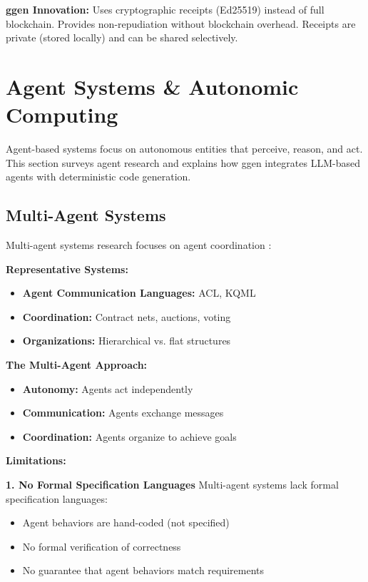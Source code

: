 \textbf{ggen Innovation:} Uses cryptographic receipts (Ed25519) instead of full blockchain. Provides non-repudiation without blockchain overhead. Receipts are private (stored locally) and can be shared selectively.

\section{Agent Systems \& Autonomic Computing}

Agent-based systems focus on autonomous entities that perceive, reason, and act. This section surveys agent research and explains how ggen integrates LLM-based agents with deterministic code generation.

\subsection{Multi-Agent Systems}

Multi-agent systems research focuses on agent coordination \cite{wooldridge1995multiagent, weiss1999multiagent}:

\textbf{Representative Systems:}
\begin{itemize}
    \item \textbf{Agent Communication Languages:} ACL, KQML
    \item \textbf{Coordination:} Contract nets, auctions, voting
    \item \textbf{Organizations:} Hierarchical vs. flat structures
\end{itemize}

\textbf{The Multi-Agent Approach:}
\begin{itemize}
    \item \textbf{Autonomy:} Agents act independently
    \item \textbf{Communication:} Agents exchange messages
    \item \textbf{Coordination:} Agents organize to achieve goals
\end{itemize}

\textbf{Limitations:}

\textbf{1. No Formal Specification Languages}
Multi-agent systems lack formal specification languages:
\begin{itemize}
    \item Agent behaviors are hand-coded (not specified)
    \item No formal verification of correctness
    \item No guarantee that agent behaviors match requirements
\end{itemize}

